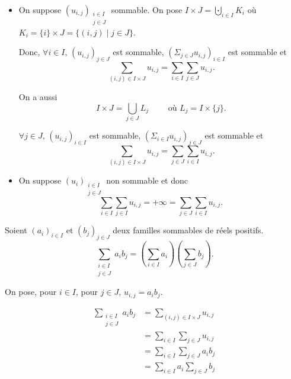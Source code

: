 \begin{prv}
	\begin{itemize}
		\item On suppose $(u_{i,j})_{\substack{i \in I\\j\in J}}$ sommable. On pose $I \times J = \bigcupdot_{i \in I} K_i$ où $K_i = \{i\} \times J = \{(i,j)  \mid j \in J\}$.
			
			Donc, $\forall i \in I,\,(u_{i,j})_{j \in J}$ est sommable, $\left( \Sigma_{j \in J} u_{i,j} \right)_{i \in I}$ est sommable et \[
				\sum_{(i,j) \in I\times J} u_{i,j} = \sum_{i \in I} \sum_{j \in J} u_{i,j}
			.\]

			On a aussi \[
				I \times J = \bigcup_{j \in J} L_j \qquad \text{ où } L_j = I \times \{j\}
			.\]

			$\forall j \in J,\,(u_{i,j})_{i\in I}$ est sommable, $\left( \Sigma_{i \in I}u_{i,j} \right)_{j \in J}$ est sommable et \[
				\sum_{(i,j) \in I\times J} u_{i,j} = \sum_{j \in J} \sum_{i \in I} u_{i,j}
			.\]
		\item On suppose $(u_i)_{\substack{i \in I\\j \in J}}$ non sommable et donc \[
				\sum_{i \in I} \sum_{j \in I} u_{i,j} = +\infty = \sum_{j \in J} \sum_{i \in I} u_{i,j}
			.\]
	\end{itemize}
\end{prv}

\begin{crlr}
	Soient $(a_i)_{i\in I}$ et $(b_j)_{j\in J}$ deux familles sommables de réels positifs.
	\[
		\sum_{\substack{i \in I\\j \in J}} a_i b_j = \left( \sum_{i \in I} a_i \right) \left( \sum_{j \in J} b_j \right)
	.\]
\end{crlr}

\begin{prv}
	On pose, pour $i \in I$, pour $j \in J$, $u_{i,j} = a_i b_j$.

	\begin{align*}
		\sum_{\substack{i \in I\\j \in J}} a_i b_j &= \sum_{(i,j) \in I\times J} u_{i,j} \\
		&= \sum_{i \in I} \sum_{j \in J} u_{i,j} \\
		&= \sum_{i \in I} \sum_{j \in J} a_i b_j \\
		&= \sum_{i \in I} a_i \sum_{j \in J} b_j \\
	\end{align*}
\end{prv}


